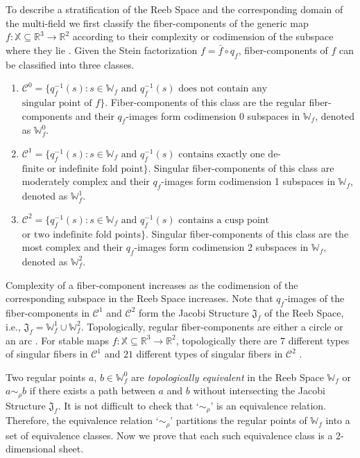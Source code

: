 \documentclass[twocolumn]{article}
\newcommand{\X}{\mathbb{X}}
\newcommand{\R}{\mathbb{R}}
\newcommand{\RS}{\mathbb{W}_f}
\newcommand{\JS}{\mathfrak{J}_f}
\begin{document}
To describe a stratification of the Reeb Space and the corresponding
domain of the multi-field we first classify the fiber-components of the generic map $f: \X\subseteq
  \R^3\rightarrow\R^2$ according to their complexity or codimension of the subspace where they lie \cite{Saeki2014}.
 Given the Stein factorization $f=\bar{f}\circ q_f$, fiber-components  of $f$ can be classified into three classes.
\begin{enumerate}
\item $\mathcal{C}^0=\{q_f^{-1}(s): s\in \RS \text{ and } q_f^{-1}(s) \text{ does
  not contain any }$ $\text{singular point of } f\}$. Fiber-components
of this class are the regular fiber-components and their $q_f$-images 
form codimension 0 subspaces in $\RS$, denoted as $\RS^0$. 

\item $\mathcal{C}^1=\{q_f^{-1}(s): s\in \RS \text{ and } q_f^{-1}(s)
  \text{ contains exactly one de-}$ $\text{finite or indefinite fold point}\}.$
Singular fiber-components of this class are moderately complex and
  their $q_f$-images form codimension 1 subspaces  in $\RS$, denoted as $\RS^1$.

\item $\mathcal{C}^2=\{q_f^{-1}(s):  s\in \RS \text{ and } q_f^{-1}(s)
  \text{ contains a cusp point}$ $\text{or two indefinite fold points}\}.$ 
 Singular fiber-components of this class
  are the most complex and their $q_f$-images form codimension 2
  subspaces  in $\RS$, denoted as $\RS^2$.
\end{enumerate}

\noindent
Complexity of a fiber-component increases as the codimension of the
corresponding subspace in the Reeb Space increases.
Note that $q_f$-images of the fiber-components in $\mathcal{C}^1$ and $\mathcal{C}^2$ form the Jacobi
Structure $\JS$ of the Reeb Space, i.e., $\JS=\RS^1\cup \RS^2$. Topologically, regular fiber-components are
either a circle or an arc \cite{Saeki2015}. For stable maps $f: \X\subseteq
  \R^3\rightarrow\R^2$, topologically there are $7$ different types of singular
  fibers in $\mathcal{C}^1$ and $21$ different types of singular
  fibers in $\mathcal{C}^2$ \cite{Saeki2015}.

Two regular points $a,\, b \in \RS^0$ are \emph{topologically
equivalent} in the Reeb Space $\RS$ or $a\sim_\rho b$ if there exists a path
between $a$ and $b$ without intersecting the Jacobi Structure $\JS$.
It is not difficult to check that `$\sim_\rho$' is an equivalence relation.
Therefore, the equivalence relation `$\sim_\rho$' partitions the regular points
of $\RS$ into a set of equivalence classes.
Now we prove that each such equivalence class is a 2-dimensional sheet.
\end{document}

